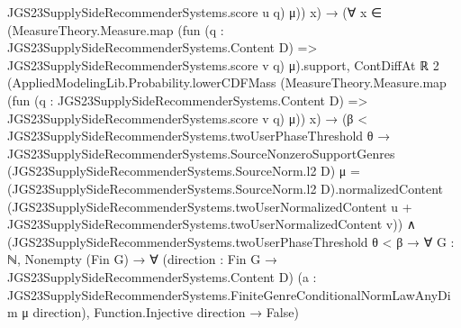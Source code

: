 \documentclass[10pt]{article}
\begin{document}
\begin{ReviewVerbatim}
                                      JGS23SupplySideRecommenderSystems.score u q)
                                    μ))
                                x) →
                            (∀
                                x ∈
                                  (MeasureTheory.Measure.map
                                      (fun (q : JGS23SupplySideRecommenderSystems.Content D) =>
                                        JGS23SupplySideRecommenderSystems.score v q)
                                      μ).support,
                                ContDiffAt ℝ 2
                                  (AppliedModelingLib.Probability.lowerCDFMass
                                    (MeasureTheory.Measure.map
                                      (fun (q : JGS23SupplySideRecommenderSystems.Content D) =>
                                        JGS23SupplySideRecommenderSystems.score v q)
                                      μ))
                                  x) →
                              (β < JGS23SupplySideRecommenderSystems.twoUserPhaseThreshold θ →
                                  JGS23SupplySideRecommenderSystems.SourceNonzeroSupportGenres
                                      (JGS23SupplySideRecommenderSystems.SourceNorm.l2 D) μ =
                                    {(JGS23SupplySideRecommenderSystems.SourceNorm.l2 D).normalizedContent
                                        (JGS23SupplySideRecommenderSystems.twoUserNormalizedContent u +
                                          JGS23SupplySideRecommenderSystems.twoUserNormalizedContent v)}) ∧
                                (JGS23SupplySideRecommenderSystems.twoUserPhaseThreshold θ < β →
                                  ∀ {G : ℕ},
                                    Nonempty (Fin G) →
                                      ∀ (direction : Fin G → JGS23SupplySideRecommenderSystems.Content D)
                                        (a :
                                          JGS23SupplySideRecommenderSystems.FiniteGenreConditionalNormLawAnyDim μ
                                            direction),
                                        Function.Injective direction → False)
\end{ReviewVerbatim}
\end{document}
